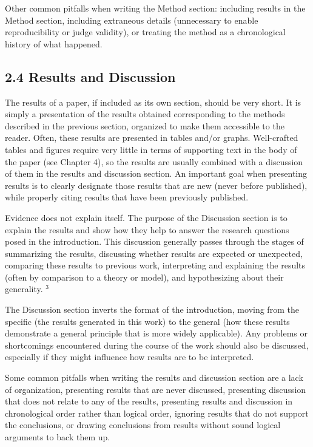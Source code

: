 Other common pitfalls when writing the Method section: including results in the Method section, including extraneous details (unnecessary to enable reproducibility or judge validity), or treating the method as a chronological history of what happened.

\subsection*{2.4 Results and Discussion}
The results of a paper, if included as its own section, should be very short. It is simply a presentation of the results obtained corresponding to the methods described in the previous section, organized to make them accessible to the reader. Often, these results are presented in tables and/or graphs. Well-crafted tables and figures require very little in terms of supporting text in the body of the paper (see Chapter 4), so the results are usually combined with a discussion of them in the results and discussion section. An important goal when presenting results is to clearly designate those results that are new (never before published), while properly citing results that have been previously published.

Evidence does not explain itself. The purpose of the Discussion section is to explain the results and show how they help to answer the research questions posed in the introduction. This discussion generally passes through the stages of summarizing the results, discussing whether results are expected or unexpected, comparing these results to previous work, interpreting and explaining the results (often by comparison to a theory or model), and hypothesizing about their generality. ${ }^{3}$

The Discussion section inverts the format of the introduction, moving from the specific (the results generated in this work) to the general (how these results demonstrate a general principle that is more widely applicable). Any problems or shortcomings encountered during the course of the work should also be discussed, especially if they might influence how results are to be interpreted.

Some common pitfalls when writing the results and discussion section are a lack of organization, presenting results that are never discussed, presenting discussion that does not relate to any of the results, presenting results and discussion in chronological order rather than logical order, ignoring results that do not support the conclusions, or drawing conclusions from results without sound logical arguments to back them up.

